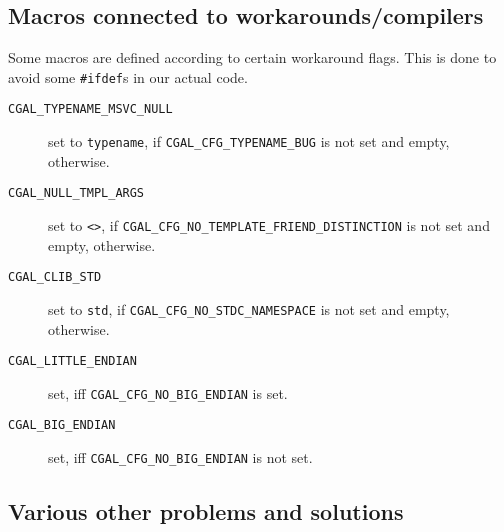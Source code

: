 \subsection{Macros connected to workarounds/compilers}
\label{sec:workaround_macros}

Some macros are defined according to certain workaround flags. This is
done to avoid some \texttt{\#ifdef}s in our actual code.

\begin{description}
\item[\texttt{CGAL\_TYPENAME\_MSVC\_NULL}] set to \texttt{typename},
  if {\texttt{CGAL\_CFG\_TYPENAME\_BUG}} is not set and
  empty, otherwise.
\item[\texttt{CGAL\_NULL\_TMPL\_ARGS}] set to \texttt{<>}, if
  {\texttt{CGAL\_CFG\_NO\_TEMPLATE\_FRIEND\_DISTINCTION}}
  is not set and empty, otherwise.
\item[\texttt{CGAL\_CLIB\_STD}] 
  set to \texttt{std}, if
  {\texttt{CGAL\_CFG\_NO\_STDC\_NAMESPACE}} is not set and
  empty, otherwise.
\item[\texttt{CGAL\_LITTLE\_ENDIAN}] set, iff
  {\texttt{CGAL\_CFG\_NO\_BIG\_ENDIAN}} is set.
\item[\texttt{CGAL\_BIG\_ENDIAN}] set, iff
  {\texttt{CGAL\_CFG\_NO\_BIG\_ENDIAN}} is not set.
\end{description}


\subsection{Various other problems and solutions}
\label{sec:various_problems}

